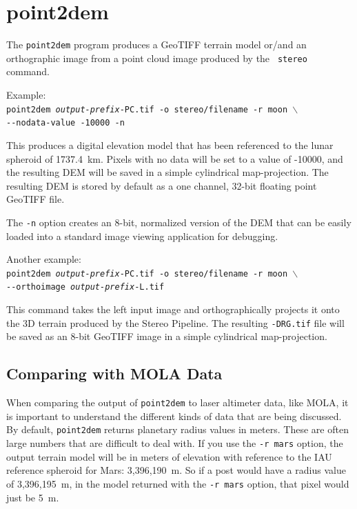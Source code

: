 
\section{point2dem}
\label{point2dem}

The \texttt{point2dem} program produces a GeoTIFF terrain model or/and
an orthographic image from a point cloud image produced by the {\tt
  stereo} command.

Example:\\
\hspace*{2em}\texttt{point2dem \textit{output-prefix}-PC.tif -o stereo/filename -r moon $\backslash$} \\
\hspace*{4em}\texttt{-\/-nodata-value -10000 -n}

This produces a digital elevation model that has been referenced to
the lunar spheroid of 1737.4~km.  Pixels with no data will be set to a
value of -10000, and the resulting \ac{DEM} will be saved in a simple
cylindrical map-projection.  The resulting \ac{DEM} is stored by default as
a one channel, 32-bit floating point GeoTIFF file.

The {\tt -n} option creates an 8-bit, normalized version of the DEM
that can be easily loaded into a standard image viewing application
for debugging.

Another example: \\
\hspace*{2em}\texttt{point2dem \textit{output-prefix}-PC.tif -o stereo/filename -r moon $\backslash$} \\
\hspace*{4em}\texttt{-\/-orthoimage \textit{output-prefix}-L.tif}

This command takes the left input image and orthographically projects
it onto the 3D terrain produced by the Stereo Pipeline.  The resulting
{\tt *-DRG.tif} file will be saved as an 8-bit GeoTIFF image in a
simple cylindrical map-projection.

\subsection{Comparing with MOLA Data}

When comparing the output of \texttt{point2dem} to laser altimeter
data, like MOLA, it is important to understand the different kinds
of data that are being discussed.  By default, \texttt{point2dem}
returns planetary radius values in meters.  These are often large
numbers that are difficult to deal with.  If you use the \texttt{-r
mars} option, the output terrain model will be in meters of elevation
with reference to the IAU reference spheroid for Mars: 3,396,190~m.
So if a post would have a radius value of 3,396,195~m, in the model
returned with the \texttt{-r mars} option, that pixel would just be 5~m.

